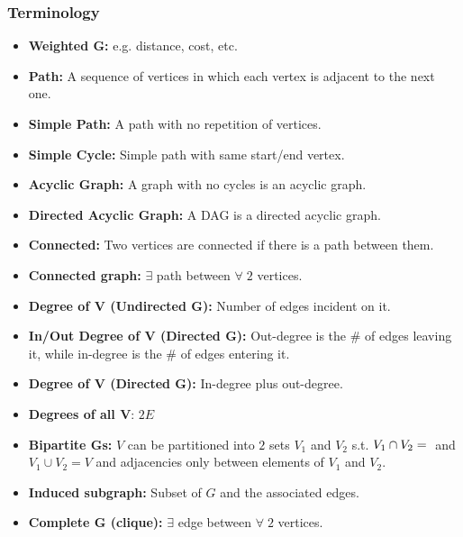     \subsubsection{Terminology}
    \begin{terminology}
        \begin{itemize}
            \item \textbf{Weighted G:} e.g. distance, cost, etc.

            \item \textbf{Path:} A sequence of vertices in which each vertex is adjacent to the next one.
            \item \textbf{Simple Path:} A path with no repetition of vertices.

            \item \textbf{Simple Cycle:} Simple path with same start/end vertex.

            \item \textbf{Acyclic Graph:} A graph with no cycles is an acyclic graph.
            \item \textbf{Directed Acyclic Graph:} A DAG is a directed acyclic graph.

            \item \textbf{Connected:} Two vertices are connected if there is a path between them.
            \item \textbf{Connected graph:} $\exists$ path between $\forall \; 2$ vertices. 

            \item \textbf{Degree of V (Undirected G):} Number of edges incident on it.
            \item \textbf{In/Out Degree of V (Directed G):} Out-degree is the \# of edges leaving it, while in-degree is the \# of edges entering it.
            \item \textbf{Degree of V (Directed G):} In-degree plus out-degree.
            \item \textbf{Degrees of all V}: $2E$

            \item \textbf{Bipartite Gs:} $V$ can be partitioned into $2$ sets $V_1$ and $V_2$ s.t. $V_1 \cap V_2 = \null$ and $V_1 \cup V_2 = V$ and adjacencies only between elements of $V_1$ and $V_2$.

            \item \textbf{Induced subgraph:} Subset of $G$ and the associated edges.
            \item \textbf{Complete G (clique):} $\exists$ edge between $\forall \; 2$ vertices. 
        \end{itemize}
    \end{terminology}


